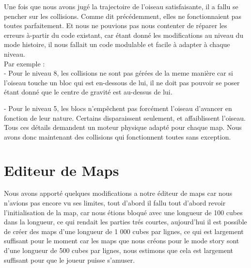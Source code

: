 \documentclass [11pt]{report}
\begin{document}
		\indent Une fois que nous avons jugé la trajectoire de l'oiseau satisfaisante, il a fallu se pencher sur les collisions. Comme dit précédemment, elles ne fonctionnaient pas toutes parfaitement. Et nous ne pouvions pas nous contenter de réparer les erreurs à-partir du code existant, car étant donné les modifications au niveau du mode histoire, il nous fallait un code modulable et facile à adapter à chaque niveau.\\
		
		\noindent Par exemple :\\
		\indent\indent - Pour le niveau 8, les collisions ne sont pas gérées de la meme manière car si l'oiseau touche un bloc qui est en-dessous de lui, il ne doit pas pouvoir se poser étant donné que le centre de gravité est au-dessus de lui.
		
		\indent\indent - Pour le niveau 5, les blocs n'empêchent pas forcément l'oiseau d'avancer en fonction de leur nature. Certains disparaissent seulement, et affaiblissent l'oiseau.\\
		
		
		Tous ces détails demandent un moteur physique adapté pour chaque map. Nous avons donc maintenant des collisions qui fonctionnent toutes sans exception.
		
		\vspace{10mm}
		
	\section{Editeur de Maps}
		Nous avons apporté quelques modifications a notre éditeur de maps car nous n'avions pas encore vu ses limites, tout d'abord il fallu tout d'abord revoir l'initialisation de la map, car nous étions bloqué avec une longueur de 100 cubes dans la longueur, ce qui rendait les parties trés courtes, aujourd'hui il est possible de créer des maps d'une longueur de 1 000 cubes par lignes, ce qui est largement suffisant pour le moment car les maps que nous créons pour le mode story sont d'une longueur de 500 cubes par lignes, nous estimons que cela est largement suffisant pour que le joueur puisse s'amuser.\\
				
\end{document}
